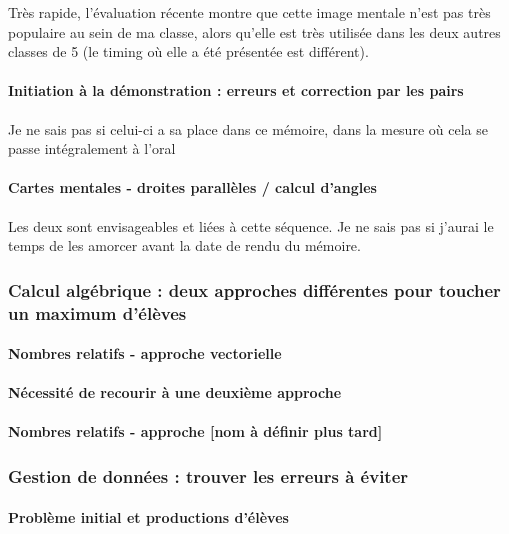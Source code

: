 Très rapide, l'évaluation récente montre que cette image mentale n'est pas très populaire au sein de ma classe, alors qu'elle est très utilisée dans les deux autres classes de 5 (le timing où elle a été présentée est différent).

\paragraph{Initiation à la démonstration : erreurs et correction par les pairs}

{\color{red} Je ne sais pas si celui-ci a sa place dans ce mémoire, dans la mesure où cela se passe intégralement à l'oral}

\paragraph{Cartes mentales - droites parallèles / calcul d'angles}

Les deux sont envisageables et liées à cette séquence. {\color{red}Je ne sais pas si j'aurai le temps de les amorcer avant la date de rendu du mémoire.}

\subsubsection{Calcul algébrique : deux approches différentes pour toucher un maximum d'élèves}

\paragraph{Nombres relatifs - approche vectorielle}

\paragraph{Nécessité de recourir à une deuxième approche}

\paragraph{Nombres relatifs - approche [nom à définir plus tard]}

\subsubsection{Gestion de données : trouver les erreurs à éviter}

\paragraph{Problème initial et productions d'élèves}

